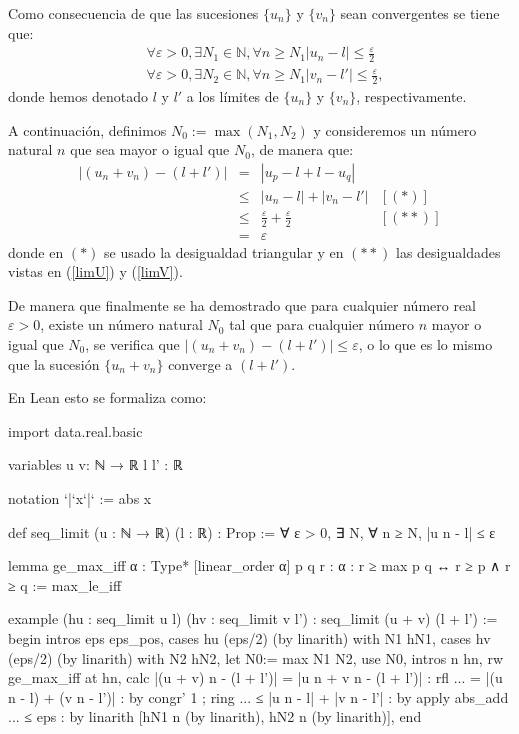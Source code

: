 \begin{demostracion}
  Como consecuencia de que las sucesiones \(\{u_n\}\) y \(\{v_n\}\) sean
  convergentes se tiene que:
  \begin{align}
    & ∀ ε > 0, ∃ N_1 ∈ ℕ, ∀ n ≥ N_1 |u_n - l| ≤ \frac{ε}{2} \label{limU} \\
    & ∀ ε > 0, ∃ N_2 ∈ ℕ, ∀ n ≥ N_1 |v_n - l'| ≤ \frac{ε}{2}, \label{limV}
  \end{align}
  donde hemos denotado \(l\) y \(l'\) a los límites de \(\{u_n\}\) y
  \(\{v_n\}\), respectivamente.

  A continuación, definimos \(N_0 := \max(N_1,N_2)\) y consideremos un
  número natural \(n\) que sea mayor o igual que \(N_0\), de manera que:
  \[\begin{array}{llll}
      |(u_n+v_n)-(l+l')| &= &|u_p-l+l-u_q|           & \\
                         &≤ &|u_n-l|+|v_n-l'|        & [(*)] \\
                         &≤ &\frac{ε}{2}+\frac{ε}{2} & [(**)] \\
                         &= &ε
  \end{array}\]
  donde en \((*)\) se usado la desigualdad triangular y en \((**)\) las
  desigualdades vistas en (\ref{limU}) y (\ref{limV}).

  De manera que finalmente se ha demostrado que para cualquier número
  real \(ε > 0\), existe un número natural \(N_0\) tal que para
  cualquier número \(n\) mayor o igual que \(N_0\), se verifica que
  \(|(u_n+v_n)-(l+l')| ≤ ε\), o lo que es lo mismo que la sucesión
  \(\{u_n+v_n\}\) converge a \((l+l')\).
\end{demostracion}

En Lean esto se formaliza como:
\begin{leancode}
import data.real.basic

variables {u v: ℕ → ℝ} {l l' : ℝ}

notation `|`x`|` := abs x

def seq_limit (u : ℕ → ℝ) (l : ℝ) : Prop :=
∀ ε > 0, ∃ N, ∀ n ≥ N, |u n - l| ≤ ε

lemma ge_max_iff {α : Type*} [linear_order α] {p q r : α} :
r ≥ max p q  ↔ r ≥ p ∧ r ≥ q :=
max_le_iff

example (hu : seq_limit u l) (hv : seq_limit v l') :
seq_limit (u + v) (l + l') :=
begin
  intros eps eps_pos,
  cases hu (eps/2) (by linarith) with N1 hN1,
  cases hv (eps/2) (by linarith) with N2 hN2,
  let N0:= max N1 N2,
  use N0,
  intros n hn,
  rw ge_max_iff at hn,
  calc  |(u + v) n - (l + l')|
      = |u n + v n - (l + l')|   : rfl
  ... = |(u n - l) + (v n - l')| : by congr' 1 ; ring
  ... ≤ |u n - l| + |v n - l'|   : by apply abs_add
  ... ≤  eps                     : by linarith [hN1 n (by linarith),
                                                hN2 n (by linarith)],
end
\end{leancode}


